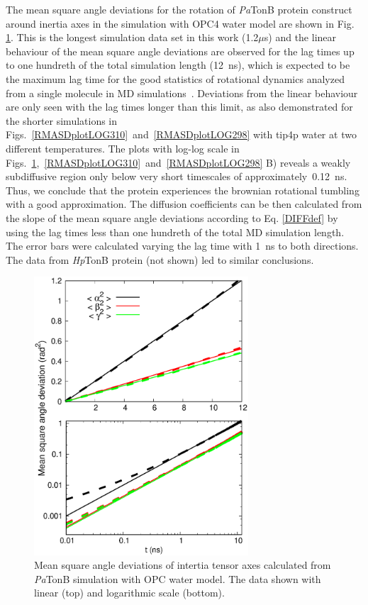 \documentclass[pre,aps,floatfix,authordate1-4,twocolumn]{revtex4-1}
\begin{document}
The mean square angle deviations for the rotation of {\it Pa}TonB protein construct
around inertia axes in the simulation with OPC4 water model
are shown in Fig. \ref{RMASDplot}. This is the longest
simulation data set in this work (1.2$\mu$s) and the
linear behaviour of the mean square angle deviations are observed
for the lag times up to one hundreth of the total simulation length (12~ns),
which is expected to be the maximum lag time for the good statistics
of rotational dynamics analyzed from a single molecule in MD simulations~\cite{lu06}.
Deviations from the linear behaviour are only seen with the lag times longer
than this limit, as also demonstrated for the shorter simulations in
Figs.~\ref{RMASDplotLOG310}~and~\ref{RMASDplotLOG298} with tip4p water at
two different temperatures. The plots with log-log scale in
Figs.~\ref{RMASDplot},~\ref{RMASDplotLOG310}~and~\ref{RMASDplotLOG298} B)
reveals a weakly subdiffusive region only below very short timescales
of approximately~0.12~ns. Thus, we conclude that the protein
experiences the brownian rotational tumbling with  a good approximation.
The diffusion coefficients can be then calculated from the slope of the mean square angle
deviations according to Eq. \ref{DIFFdef} by using the lag times less than
one hundreth of the total MD simulation length.
The error bars were calculated varying the lag time with 1~ns to both directions.
The data from {\it Hp}TonB protein (not shown) led to similar conclusions.
\begin{figure}[htb]
  \includegraphics[width=8.0cm]{../Figs/RMASDplotPsTonBOPC4.eps}%
  \caption{Mean square angle deviations of intertia tensor axes calculated from
    {\it Pa}TonB simulation with OPC water model. The data shown with linear (top) and logarithmic scale (bottom).
    \label{RMASDplot}}%
\end{figure}
\end{document}
